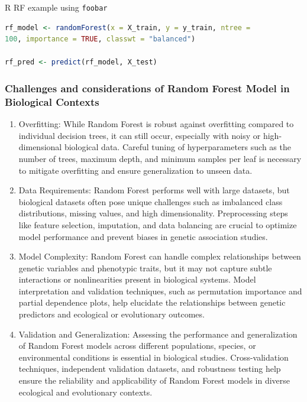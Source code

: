 \begin{algorithm}
    \caption{R RF example using \texttt{foobar}} \label{alg:rf_r}
\begin{lstlisting}[language=R]
rf_model <- randomForest(x = X_train, y = y_train, ntree =
100, importance = TRUE, classwt = "balanced")

rf_pred <- predict(rf_model, X_test)
\end{lstlisting}
\end{algorithm}

\subsubsection{Challenges and considerations of Random Forest Model in Biological Contexts}

\begin{enumerate}
\item
  Overfitting: While Random Forest is robust against overfitting
  compared to individual decision trees, it can still occur, especially
  with noisy or high-dimensional biological data. Careful tuning of
  hyperparameters such as the number of trees, maximum depth, and
  minimum samples per leaf is necessary to mitigate overfitting and
  ensure generalization to unseen data.
\item
  Data Requirements: Random Forest performs well with large datasets,
  but biological datasets often pose unique challenges such as
  imbalanced class distributions, missing values, and high
  dimensionality. Preprocessing steps like feature selection,
  imputation, and data balancing are crucial to optimize model
  performance and prevent biases in genetic association studies.
\item
  Model Complexity: Random Forest can handle complex relationships
  between genetic variables and phenotypic traits, but it may not
  capture subtle interactions or nonlinearities present in biological
  systems. Model interpretation and validation techniques, such as
  permutation importance and partial dependence plots, help elucidate
  the relationships between genetic predictors and ecological or
  evolutionary outcomes.
\item
  Validation and Generalization: Assessing the performance and
  generalization of Random Forest models across different populations,
  species, or environmental conditions is essential in biological
  studies. Cross-validation techniques, independent validation datasets,
  and robustness testing help ensure the reliability and applicability
  of Random Forest models in diverse ecological and evolutionary
  contexts.
\end{enumerate}

